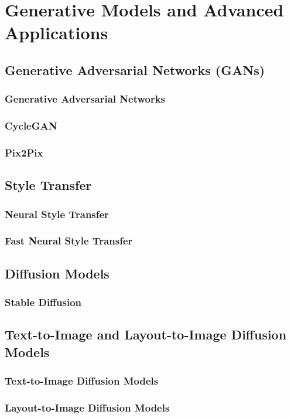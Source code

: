 \part{Generative Models and Advanced Applications}

\chapter{Generative Adversarial Networks (GANs)}
\section{Generative Adversarial Networks}
\section{CycleGAN}
\section{Pix2Pix}

\chapter{Style Transfer}
\section{Neural Style Transfer}
\section{Fast Neural Style Transfer}

\chapter{Diffusion Models}
\section{Stable Diffusion}

\chapter{Text-to-Image and Layout-to-Image Diffusion Models}
\section{Text-to-Image Diffusion Models}
\section{Layout-to-Image Diffusion Models}